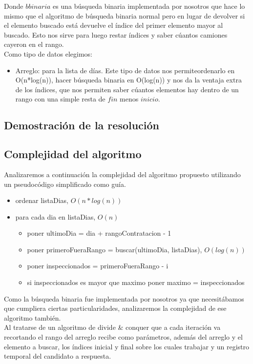 Donde $bbinaria$ es una b\'usqueda binaria implementada por nosotros que hace lo mismo que el algoritmo de b\'usqueda binaria normal pero en lugar de devolver si el elemento buscado est\'a devuelve el \'indice del primer elemento mayor al buscado. Esto nos sirve para luego restar \'indices y saber c\'uantos camiones cayeron en el rango.\\

Como tipo de datos elegimos:
\begin{itemize}
\item Arreglo: para la lista de d\'ias. Este tipo de datos nos permiteordenarlo en O(n*log(n)), hacer b\'usqueda binaria en O(log(n)) y nos da la ventaja extra de los \'indices, que nos permiten saber c\'uantos elementos hay dentro de un rango con una simple resta de $fin$ menos $inicio$.
\end{itemize}

\subsection{Demostraci\'on de la resoluci\'on}

\subsection{Complejidad del algoritmo}

Analizaremos a continuaci\'on la complejidad del algoritmo propuesto utilizando un pseudoc\'odigo simplificado como gu\'ia.

\begin{itemize}
\item ordenar listaDias, $O(n*log(n))$
\item para cada dia en listaDias, $O(n)$
\begin{itemize}
	\item poner ultimoDia = dia + rangoContratacion - 1
	\item poner primeroFueraRango = buscar(ultimoDia, listaDias), $O(log(n))$
	\item poner inspeccionados = primeroFueraRango - i
	\item si inspeccionados es mayor que maximo poner maximo = inspeccionados
\end{itemize}
\end{itemize}

Como la b\'usqueda binaria fue implementada por nosotros ya que necesit\'abamos que cumpliera ciertas particularidades, analizaremos la complejidad de ese algoritmo tambi\'en.\\
Al tratarse de un algoritmo de divide \& conquer que a cada iteraci\'on va recortando el rango del arreglo recibe como par\'ametros, adem\'as del arreglo y el elemento a buscar, los \'indices inicial y final sobre los cuales trabajar y un registro temporal del candidato a respuesta.

